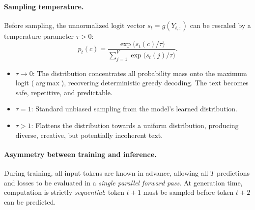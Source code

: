 \documentclass[11pt,a4paper]{article}
\DeclareMathOperator{\argmax}{arg\,max}
\theoremstyle{definition}
\theoremstyle{plain}
\begin{document}
\paragraph{Sampling temperature.}
Before sampling, the unnormalized logit vector $s_t = g(Y_{t,:})$ can be rescaled by a temperature parameter $\tau > 0$:
\begin{equation}\label{eq:temperature}
p_t(c) = \frac{\exp\big(s_t(c) / \tau\big)}{\sum_{j=1}^V \exp\big(s_t(j) / \tau\big)}.
\end{equation}
\begin{itemize}[nosep]
\item $\tau \to 0$: The distribution concentrates all probability mass onto the maximum logit ($\argmax$), recovering deterministic greedy decoding. The text becomes safe, repetitive, and predictable.
\item $\tau = 1$: Standard unbiased sampling from the model's learned distribution.
\item $\tau > 1$: Flattens the distribution towards a uniform distribution, producing diverse, creative, but potentially incoherent text.
\end{itemize}

\paragraph{Asymmetry between training and inference.}
During training, all input tokens are known in advance, allowing all $T$ predictions and losses to be evaluated in a \emph{single parallel forward pass}. At generation time, computation is strictly \emph{sequential}: token $t+1$ must be sampled before token $t+2$ can be predicted.
\end{document}
